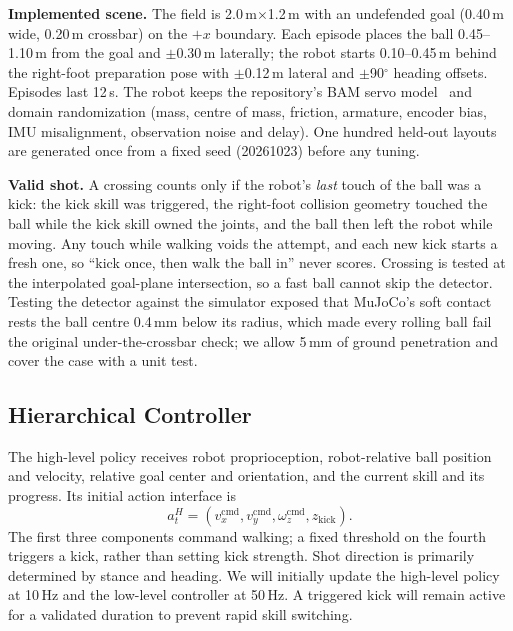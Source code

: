 \documentclass[10pt,twocolumn,letterpaper]{article}
\begin{document}
{\color{blue}\textbf{Implemented scene.} The field is 2.0\,m$\times$1.2\,m with an undefended goal (0.40\,m wide, 0.20\,m crossbar) on the $+x$ boundary. Each episode places the ball 0.45--1.10\,m from the goal and $\pm$0.30\,m laterally; the robot starts 0.10--0.45\,m behind the right-foot preparation pose with $\pm$0.12\,m lateral and $\pm$90$^\circ$ heading offsets. Episodes last 12\,s. The robot keeps the repository's BAM servo model~\cite{bam} and domain randomization (mass, centre of mass, friction, armature, encoder bias, IMU misalignment, observation noise and delay). One hundred held-out layouts are generated once from a fixed seed (20261023) before any tuning.

\textbf{Valid shot.} A crossing counts only if the robot's \emph{last} touch of the ball was a kick: the kick skill was triggered, the right-foot collision geometry touched the ball while the kick skill owned the joints, and the ball then left the robot while moving. Any touch while walking voids the attempt, and each new kick starts a fresh one, so ``kick once, then walk the ball in'' never scores. Crossing is tested at the interpolated goal-plane intersection, so a fast ball cannot skip the detector. Testing the detector against the simulator exposed that MuJoCo's soft contact rests the ball centre 0.4\,mm below its radius, which made every rolling ball fail the original under-the-crossbar check; we allow 5\,mm of ground penetration and cover the case with a unit test.\par}

\subsection{Hierarchical Controller}
The high-level policy receives robot proprioception, robot-relative ball position and velocity, relative goal center and orientation, and the current skill and its progress. Its initial action interface is
\begin{equation}
 a_t^H=(v_x^{\mathrm{cmd}},v_y^{\mathrm{cmd}},\omega_z^{\mathrm{cmd}},z_{\mathrm{kick}}).
\end{equation}
The first three components command walking; a fixed threshold on the fourth triggers a kick, rather than setting kick strength. Shot direction is primarily determined by stance and heading. We will initially update the high-level policy at 10\,Hz and the low-level controller at 50\,Hz. A triggered kick will remain active for a validated duration to prevent rapid skill switching.
\end{document}
